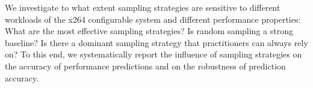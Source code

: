 We investigate to what extent sampling strategies are sensitive to different workloads of the x264 configurable system and different performance properties: What are the most effective sampling strategies? Is random sampling a strong baseline? Is there a dominant sampling strategy that practitioners can always rely on?   
To this end, we systematically report the influence of sampling strategies on the accuracy of performance predictions and on the robustness of prediction accuracy. 


